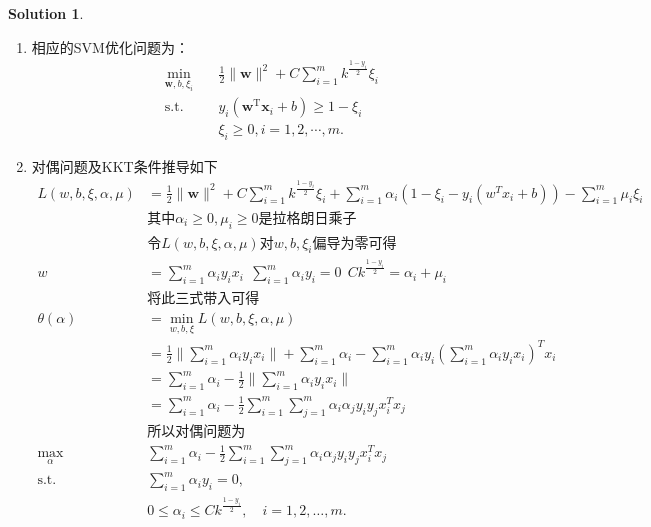 \documentclass[a4paper,UTF8]{article}
\theoremstyle{definition}
\newtheorem*{solution}{Solution}
\begin{document}
\begin{solution}\ \\
\begin{enumerate}[(1)]
	\item 相应的SVM优化问题为：
	\begin{equation*}
	\begin{split}
	\min_{\mathbf{w},b,\xi_i}& \quad \frac{1}{2} \lVert \mathbf{w} \rVert^2 + C\sum_{i=1}^m k^{\frac{1-y_i}{2}} \xi_i\\
	\text{s.t.}&  \quad y_i(\mathbf{w}^\mathrm{T}\mathbf{x}_i + b)\geq 1-\xi_i\\
	& \quad \xi_i \geq 0, i = 1,2,\cdots,m.
	\end{split}
	\end{equation*}
	\item 对偶问题及KKT条件推导如下
	\begin{equation*}
	\begin{split}
		L(w,b,\xi,\alpha,\mu) &= \frac{1}{2} \lVert \mathbf{w} \rVert^2 + C\sum_{i=1}^m k^{\frac{1-y_i}{2}} \xi_i + \sum_{i=1}^m \alpha_i(1-\xi_i-y_i(w^T x_i+b)) - \sum_{i=1}^m \mu_i \xi_i \\
		&\text{其中}\alpha_i \ge 0,\mu_i \ge 0 \text{是拉格朗日乘子}\\
		&\text{令} L(w,b,\xi,\alpha,\mu) \text{对} w,b,\xi_i \text{偏导为零可得}\\
		w &= \sum_{i=1}^m\alpha_i y_i x_i\ \ \sum_{i=1}^m \alpha_i y_i = 0\ \ C k^{\frac{1-y_i}{2}} = \alpha_i + \mu_i\\
		&\text{将此三式带入可得}\\
		\theta(\alpha)&=\min_{w,b,\xi} L(w,b,\xi,\alpha,\mu)\\
		&=\frac{1}{2}\lVert \sum_{i=1}^m \alpha_i y_i x_i \rVert + \sum_{i=1}^m \alpha_i - \sum_{i=1}^m \alpha_i y_i (\sum_{i=1}^m \alpha_i y_i x_i)^T x_i\\
		&=\sum_{i=1}^m \alpha_i-\frac{1}{2}\lVert \sum_{i=1}^m \alpha_i y_i x_i \rVert\\
		&=\sum_{i=1}^m \alpha_i-\frac{1}{2}\sum_{i=1}^m \sum_{j=1}^m \alpha_i \alpha_j y_i y_j x_i^T x_j\\
		&\text{所以对偶问题为}\\
		\max_{\alpha} \quad &\sum_{i=1}^m \alpha_i-\frac{1}{2}\sum_{i=1}^m \sum_{j=1}^m \alpha_i \alpha_j y_i y_j x_i^T x_j\\
		\text{s.t.} \quad &\sum_{i=1}^m\alpha_i y_i = 0,\\
		&0 \le \alpha_i \le C k^{\frac{1-y_i}{2}}, \quad i=1,2,\dots,m.\\

\end{split}
\end{equation*}
\end{enumerate}
\end{solution}
\end{document}
